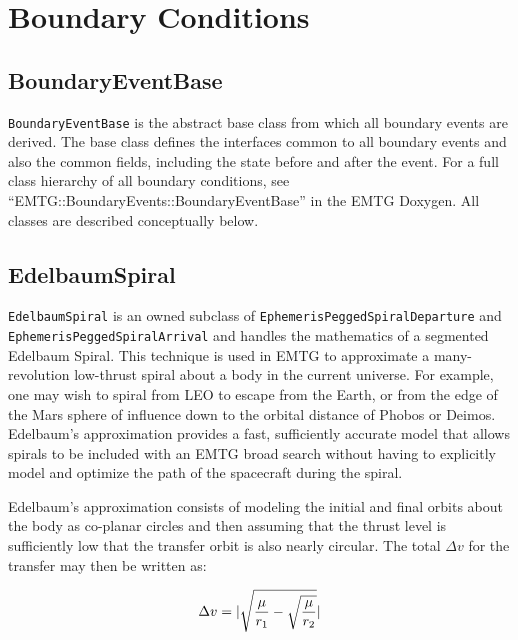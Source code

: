 


\chapter{Boundary Conditions}
\label{chap:boundary-conditions}

\section{BoundaryEventBase}
\label{sec:boundaryeventbase}

\texttt{BoundaryEventBase} is the abstract base class from which all boundary events are derived. The base class defines the interfaces common to all boundary events and also the common fields, including the state before and after the event. For a full class hierarchy of all boundary conditions, see ``EMTG::BoundaryEvents::BoundaryEventBase'' in the \ac{EMTG} Doxygen. All classes are described conceptually below.

\section{EdelbaumSpiral}
\label{sec:EdelbaumSpiral}

\texttt{EdelbaumSpiral} is an owned subclass of \texttt{EphemerisPeggedSpiralDeparture} and \texttt{EphemerisPeggedSpiralArrival} and handles the mathematics of a segmented Edelbaum Spiral. This technique is used in EMTG to approximate a many-revolution low-thrust spiral about a body in the current universe. For example, one may wish to spiral from LEO to escape from the Earth, or from the edge of the Mars sphere of influence down to the orbital distance of Phobos or Deimos. Edelbaum's approximation provides a fast, sufficiently accurate model that allows spirals to be included with an EMTG broad search without having to explicitly model and optimize the path of the spacecraft during the spiral.

Edelbaum's approximation consists of modeling the initial and final orbits about the body as co-planar circles and then assuming that the thrust level is sufficiently low that the transfer orbit is also nearly circular. The total $\Delta v$ for the transfer may then be written as:

\begin{equation}
	\label{eq:edelbaum_delta_v}
	\Delta v = \lvert\sqrt{\frac{\mu}{r_1} -\sqrt{\frac{\mu}{r_2}}}\rvert
\end{equation}

